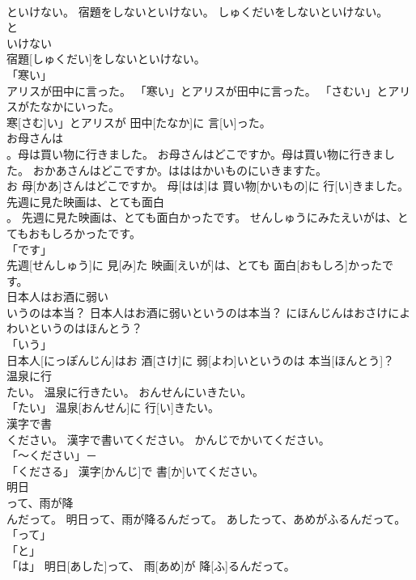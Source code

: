 \documentclass[8pt]{extreport}
\begin{document}
\begin{CJK}{UTF8}{min}
\\	といけない。	宿題をしないといけない。	しゅくだいをしないといけない。	
\\	と
\\	いけない
\\	宿題[しゅくだい]をしないといけない。		
\\	「寒い」
\\	アリスが田中に言った。	「寒い」とアリスが田中に言った。	「さむい」とアリスがたなかにいった。	
\\	寒[さむ]い」とアリスが 田中[たなか]に 言[い]った。		
\\	お母さんは
\\	。母は買い物に行きました。	お母さんはどこですか。母は買い物に行きました。	おかあさんはどこですか。はははかいものにいきますた。	
\\	お 母[かあ]さんはどこですか。 母[はは]は 買い物[かいもの]に 行[い]きました。		
\\	先週に見た映画は、とても面白
\\	。	先週に見た映画は、とても面白かったです。	せんしゅうにみたえいがは、とてもおもしろかったです。	
\\	「です」 
\\	先週[せんしゅう]に 見[み]た 映画[えいが]は、とても 面白[おもしろ]かったです。		
\\	日本人はお酒に弱い
\\	いうのは本当？	日本人はお酒に弱いというのは本当？	にほんじんはおさけによわいというのはほんとう？	
\\	「いう」 
\\	日本人[にっぽんじん]はお 酒[さけ]に 弱[よわ]いというのは 本当[ほんとう]？		
\\	温泉に行
\\	たい。	温泉に行きたい。	おんせんにいきたい。	
\\	「たい」	温泉[おんせん]に 行[い]きたい。		
\\	漢字で書
\\	ください。	漢字で書いてください。	かんじでかいてください。	
\\	「～ください」－ 
\\	「くださる」	漢字[かんじ]で 書[か]いてください。		
\\	明日
\\	って、雨が降
\\	んだって。	明日って、雨が降るんだって。	あしたって、あめがふるんだって。	
\\	「って」 
\\	「と」 
\\	「は」	明日[あした]って、 雨[あめ]が 降[ふ]るんだって。		

\end{CJK}
\end{document}
